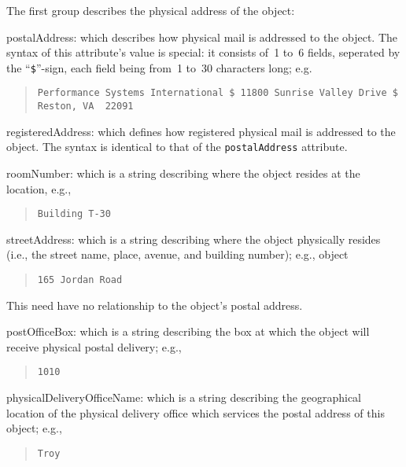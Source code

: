 The first group describes the physical address of the object:
\begin{describe}
\item[postalAddress:]
			which describes how physical mail is addressed to the
			object.
			The syntax of this attribute's value is special:
			it consists of~1 to~6 fields, seperated by the
			``\verb"$"''-sign, each field being from~1 to~30
			characters long; e.g.
\begin{quote}\tiny\begin{verbatim}
Performance Systems International $ 11800 Sunrise Valley Drive $ Reston, VA  22091
\end{verbatim}\end{quote}

\item[registeredAddress:]
			which defines how registered physical mail is
			addressed to the object.
			The syntax is identical to that of the
			\verb"postalAddress" attribute.

\item[roomNumber:]
			which is a string describing where the object resides
			at the location, e.g.,
\begin{quote}\small\begin{verbatim}
Building T-30
\end{verbatim}\end{quote}

\item[streetAddress:]
			which is a string describing where the object
			physically resides
			(i.e., the street name, place, avenue, and building
			number); e.g.,
			object
\begin{quote}\small\begin{verbatim}
165 Jordan Road
\end{verbatim}\end{quote}
			This need have no relationship to the object's
			postal address.

\item[postOfficeBox:]
			which is a string describing the box at which the
			object will receive physical postal delivery; e.g.,
\begin{quote}\small\begin{verbatim}
1010
\end{verbatim}\end{quote}

\item[physicalDeliveryOfficeName:]
			which is a string describing the geographical location
			of the physical delivery office which services the
			postal address of this object; e.g.,
\begin{quote}\small\begin{verbatim}
Troy
\end{verbatim}\end{quote}


\end{describe}
